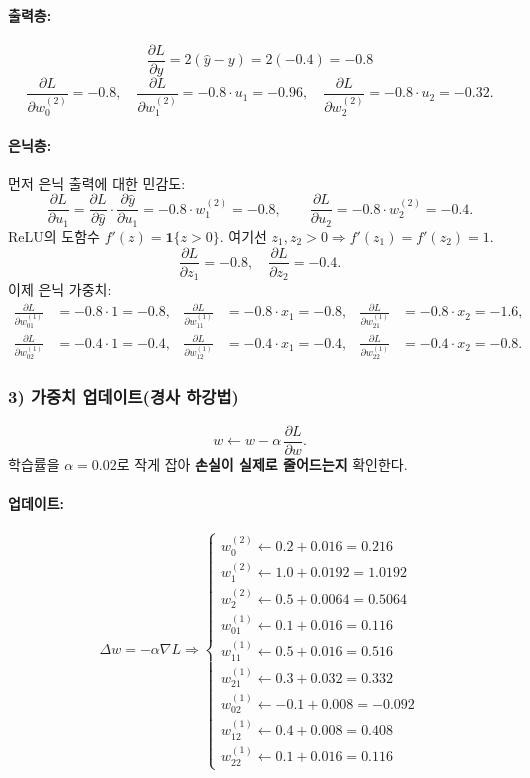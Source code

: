 \documentclass[12pt]{article}
\begin{document}
\paragraph{출력층:}
\[
\frac{\partial L}{\partial \hat{y}} = 2(\hat{y}-y)=2(-0.4)=-0.8
\]
\[
\frac{\partial L}{\partial w^{(2)}_0} = -0.8,\quad
\frac{\partial L}{\partial w^{(2)}_1} = -0.8\cdot u_1 = -0.96,\quad
\frac{\partial L}{\partial w^{(2)}_2} = -0.8\cdot u_2 = -0.32.
\]

\paragraph{은닉층:}
먼저 은닉 출력에 대한 민감도:
\[
\frac{\partial L}{\partial u_1} = \frac{\partial L}{\partial \hat{y}}\cdot \frac{\partial \hat{y}}{\partial u_1} = -0.8\cdot w^{(2)}_1 = -0.8,\qquad
\frac{\partial L}{\partial u_2} = -0.8\cdot w^{(2)}_2 = -0.4.
\]
ReLU의 도함수 \(f'(z)=\mathbf{1}\{z>0\}\). 여기선 \(z_1,z_2>0\Rightarrow f'(z_1)=f'(z_2)=1\).
\[
\frac{\partial L}{\partial z_1} = -0.8,\quad \frac{\partial L}{\partial z_2}=-0.4.
\]
이제 은닉 가중치:
\[
\begin{aligned}
\frac{\partial L}{\partial w^{(1)}_{01}} &= -0.8\cdot 1 = -0.8,&
\frac{\partial L}{\partial w^{(1)}_{11}} &= -0.8\cdot x_1 = -0.8, &
\frac{\partial L}{\partial w^{(1)}_{21}} &= -0.8\cdot x_2 = -1.6,\\
\frac{\partial L}{\partial w^{(1)}_{02}} &= -0.4\cdot 1 = -0.4,&
\frac{\partial L}{\partial w^{(1)}_{12}} &= -0.4\cdot x_1 = -0.4,&
\frac{\partial L}{\partial w^{(1)}_{22}} &= -0.4\cdot x_2 = -0.8.
\end{aligned}
\]

\subsubsection*{3) 가중치 업데이트(경사 하강법)}
\[
w \leftarrow w - \alpha \,\frac{\partial L}{\partial w}.
\]
학습률을 \(\alpha=0.02\)로 작게 잡아 \textbf{손실이 실제로 줄어드는지} 확인한다.

\paragraph{업데이트:}
\[
\Delta w = -\alpha \nabla L
\Rightarrow
\begin{cases}
w^{(2)}_0 \!\!\leftarrow 0.2 + 0.016 = 0.216 \\
w^{(2)}_1 \!\!\leftarrow 1.0 + 0.0192 = 1.0192 \\
w^{(2)}_2 \!\!\leftarrow 0.5 + 0.0064 = 0.5064 \\
w^{(1)}_{01}\!\leftarrow 0.1 + 0.016 = 0.116 \\
w^{(1)}_{11}\!\leftarrow 0.5 + 0.016 = 0.516 \\
w^{(1)}_{21}\!\leftarrow 0.3 + 0.032 = 0.332 \\
w^{(1)}_{02}\!\leftarrow -0.1 + 0.008 = -0.092 \\
w^{(1)}_{12}\!\leftarrow 0.4 + 0.008 = 0.408 \\
w^{(1)}_{22}\!\leftarrow 0.1 + 0.016 = 0.116
\end{cases}
\]
\end{document}
